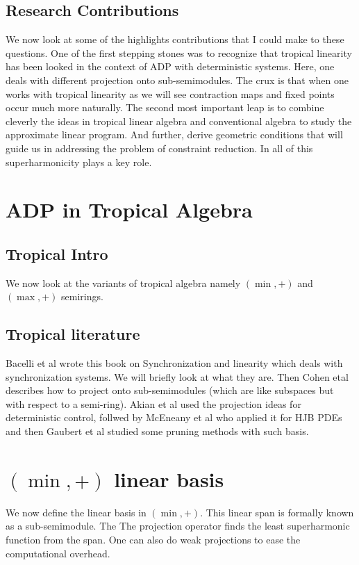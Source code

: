 \documentclass{article}
\newcommand{\maxp}{(\max,+)}
\newcommand{\minp}{(\min,+)}
\begin{document}
\subsection{Research Contributions}
We now look at some of the highlights contributions that I could make to these questions. One of the first stepping stones was to recognize that tropical linearity has been looked in the context of ADP with deterministic systems. Here, one deals with different projection onto sub-semimodules. The crux is that when one works with tropical linearity as we will see contraction maps and fixed points occur much more naturally. The second most important leap is to combine cleverly the ideas in tropical linear algebra and conventional algebra to study the approximate linear program. And further, derive geometric conditions that will guide us in addressing the problem of constraint reduction. In all of this superharmonicity plays a key role.

\section{ADP in Tropical Algebra}

\subsection{Tropical Intro}
We now look at the variants of tropical algebra namely $\minp$ and $\maxp$ semirings.

\subsection{Tropical literature}
Bacelli et al wrote this book on Synchronization and linearity which deals with synchronization systems. We will briefly look at what they are. Then Cohen etal describes how to project onto sub-semimodules (which are like subspaces but with respect to a semi-ring). Akian et al used the projection ideas for deterministic control, follwed by McEneany et al who applied it for HJB PDEs and then Gaubert et al studied some pruning methods with such basis.

\section{$\minp$ linear basis}

We now define the linear basis in $\minp$. This linear span is formally known as a sub-semimodule. The  The projection operator finds the least superharmonic function from the span. One can also do weak projections to ease the computational overhead.
\end{document}
